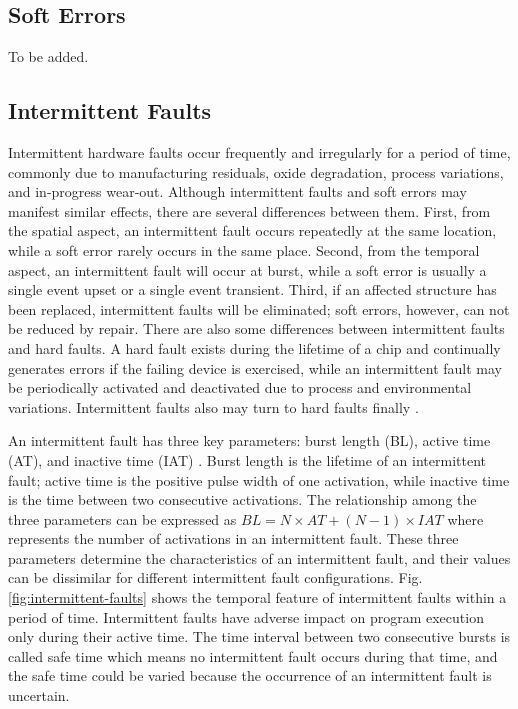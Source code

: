 \subsection{Soft Errors}
To be added.

\subsection{Intermittent Faults}
Intermittent hardware faults occur frequently and irregularly for a period of time, commonly due to manufacturing residuals, oxide degradation, process variations, and in-progress wear-out. Although intermittent faults and soft errors may manifest similar effects, there are several differences between them. First, from the spatial aspect, an intermittent fault occurs repeatedly at the same location, while a soft error rarely occurs in the same place. Second, from the temporal aspect, an intermittent fault will occur at burst, while a soft error is usually a single event upset or a single event transient. Third, if an affected structure has been replaced, intermittent faults will be eliminated; soft errors, however, can not be reduced by repair. There are also some differences between intermittent faults and hard faults. A hard fault exists during the lifetime of a chip and continually generates errors if the failing device is exercised, while an intermittent fault may be periodically activated and deactivated due to process and environmental variations. Intermittent faults also may turn to hard faults finally \cite{smolens2007detecting}.

An intermittent fault has three key parameters: burst length (BL), active time (AT), and inactive time (IAT) \cite{gracia2008analysis}. Burst length is the lifetime of an intermittent fault; active time is the positive pulse width of one activation, while inactive time is the time between two consecutive activations. The relationship among the three parameters can be expressed as $BL=N \times {AT} + (N - 1) \times IAT$ where represents the number of activations in an intermittent fault. These three parameters determine the characteristics of an intermittent fault, and their values can be dissimilar for different intermittent fault configurations. Fig. \ref{fig:intermittent-faults} shows the temporal feature of intermittent faults within a period of time. Intermittent faults have adverse impact on program execution only during their active time. The time interval between two consecutive bursts is called safe time which means no intermittent fault occurs during that time, and the safe time could be varied because the occurrence of an intermittent fault is uncertain.

